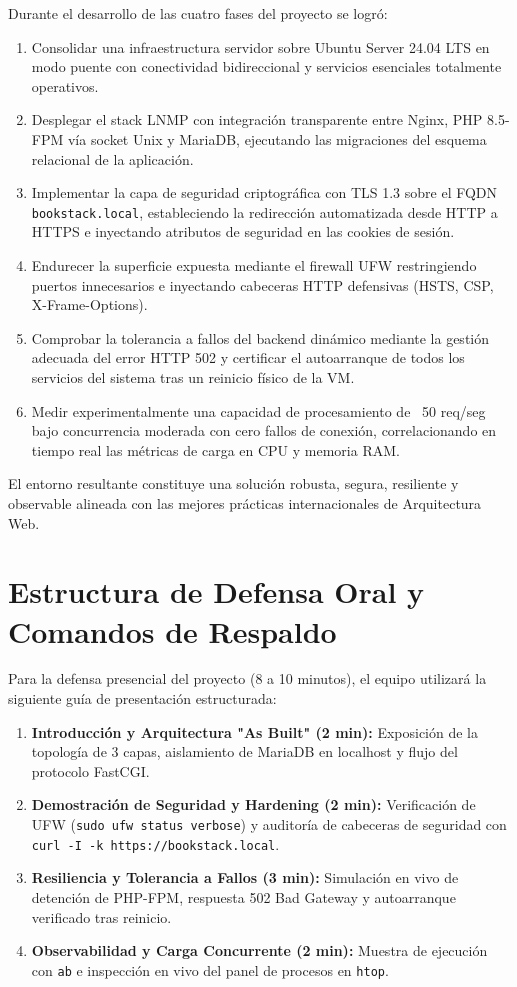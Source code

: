 \documentclass[12pt,a4paper]{article}
\begin{document}
Durante el desarrollo de las cuatro fases del proyecto se logró:
\begin{enumerate}
    \item Consolidar una infraestructura servidor sobre Ubuntu Server 24.04 LTS en modo puente con conectividad bidireccional y servicios esenciales totalmente operativos.
    \item Desplegar el stack LNMP con integración transparente entre Nginx, PHP 8.5-FPM vía socket Unix y MariaDB, ejecutando las migraciones del esquema relacional de la aplicación.
    \item Implementar la capa de seguridad criptográfica con TLS 1.3 sobre el FQDN \texttt{bookstack.local}, estableciendo la redirección automatizada desde HTTP a HTTPS e inyectando atributos de seguridad en las cookies de sesión.
    \item Endurecer la superficie expuesta mediante el firewall UFW restringiendo puertos innecesarios e inyectando cabeceras HTTP defensivas (HSTS, CSP, X-Frame-Options).
    \item Comprobar la tolerancia a fallos del backend dinámico mediante la gestión adecuada del error HTTP 502 y certificar el autoarranque de todos los servicios del sistema tras un reinicio físico de la VM.
    \item Medir experimentalmente una capacidad de procesamiento de ~50 req/seg bajo concurrencia moderada con cero fallos de conexión, correlacionando en tiempo real las métricas de carga en CPU y memoria RAM.
\end{enumerate}

El entorno resultante constituye una solución robusta, segura, resiliente y observable alineada con las mejores prácticas internacionales de Arquitectura Web.

\section{Estructura de Defensa Oral y Comandos de Respaldo}

Para la defensa presencial del proyecto (8 a 10 minutos), el equipo utilizará la siguiente guía de presentación estructurada:

\begin{enumerate}
    \item \textbf{Introducción y Arquitectura "As Built" (2 min):} Exposición de la topología de 3 capas, aislamiento de MariaDB en localhost y flujo del protocolo FastCGI.
    \item \textbf{Demostración de Seguridad y Hardening (2 min):} Verificación de UFW (\texttt{sudo ufw status verbose}) y auditoría de cabeceras de seguridad con \texttt{curl -I -k https://bookstack.local}.
    \item \textbf{Resiliencia y Tolerancia a Fallos (3 min):} Simulación en vivo de detención de PHP-FPM, respuesta 502 Bad Gateway y autoarranque verificado tras reinicio.
    \item \textbf{Observabilidad y Carga Concurrente (2 min):} Muestra de ejecución con \texttt{ab} e inspección en vivo del panel de procesos en \texttt{htop}.
\end{enumerate}
\end{document}
